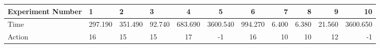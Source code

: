 \documentclass[8pt]{article}
\begin{document}
\begin{landscape}
\begin{tabular}{ | l | l | l | l | c | c | c | r | r | r | r | }
 \hline 
Experiment Number & 1 & 2 & 3 & 4 & 5 & 6 & 7 & 8 & 9 & 10\\ \hline
Time & 297.190 & 351.490 & 92.740 & 683.690 & 3600.540 & 994.270 & 6.400 & 6.380 & 21.560 & 3600.650\\ \hline
Action & 16 & 15 & 15 & 17 & -1 & 16 & 10 & 10 & 12 & -1\\ \hline\end{tabular}
\end{landscape}
\end{document}
